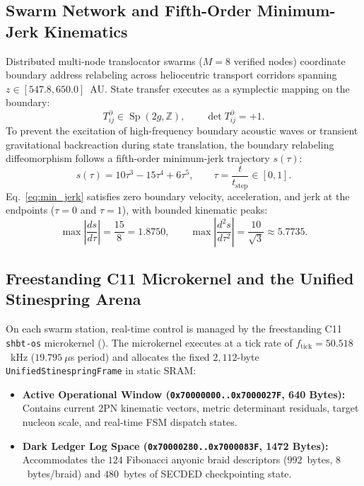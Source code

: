 \documentclass[11pt,onecolumn]{article}
\begin{document}
\subsection{Swarm Network and Fifth-Order Minimum-Jerk Kinematics}
Distributed multi-node translocator swarms ($M=8$ verified nodes) coordinate boundary address relabeling across heliocentric transport corridors spanning $z \in [547.8, 650.0]$~AU. State transfer executes as a symplectic mapping on the boundary:
\begin{equation}
T_{ij}^\partial \in \operatorname{Sp}(2g, \mathbb{Z}), \qquad \det T_{ij}^\partial = +1.
\end{equation}
To prevent the excitation of high-frequency boundary acoustic waves or transient gravitational backreaction during state translation, the boundary relabeling diffeomorphism follows a fifth-order minimum-jerk trajectory $s(\tau)$:
\begin{equation}
s(\tau) = 10\tau^3 - 15\tau^4 + 6\tau^5, \qquad \tau = \frac{t}{t_{\text{step}}} \in [0, 1].
\label{eq:min_jerk}
\end{equation}
Eq.~\eqref{eq:min_jerk} satisfies zero boundary velocity, acceleration, and jerk at the endpoints ($\tau = 0$ and $\tau = 1$), with bounded kinematic peaks:
\begin{equation}
\max\left|\frac{ds}{d\tau}\right| = \frac{15}{8} = 1.8750, \qquad \max\left|\frac{d^2s}{d\tau^2}\right| = \frac{10}{\sqrt{3}} \approx 5.7735.
\end{equation}

\FloatBarrier
\subsection{Freestanding C11 Microkernel and the Unified Stinespring Arena}
On each swarm station, real-time control is managed by the freestanding C11 \texttt{shbt-os} microkernel (). The microkernel executes at a tick rate of $f_{\text{tick}} = 50.518$~kHz ($19.795~\mu$s period) and allocates the fixed $2{,}112$-byte \texttt{UnifiedStinespringFrame} in static SRAM:
\begin{itemize}
    \item \textbf{Active Operational Window (\texttt{0x70000000..0x7000027F}, 640 Bytes):} Contains current 2PN kinematic vectors, metric determinant residuals, target nucleon scale, and real-time FSM dispatch states.
    \item \textbf{Dark Ledger Log Space (\texttt{0x70000280..0x7000083F}, 1472 Bytes):} Accommodates the $124$ Fibonacci anyonic braid descriptors ($992$~bytes, $8$~bytes/braid) and $480$~bytes of SECDED checkpointing state.
\end{itemize}
\end{document}
